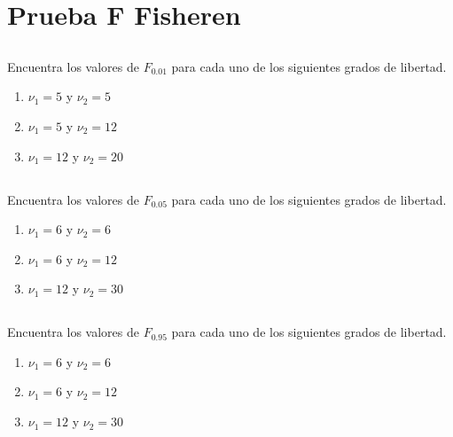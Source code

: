 \documentclass[11pt,letterpaper]{report}
\begin{document}
    \section{Prueba F Fisheren}
      \subsection{}
        Encuentra los valores de $F_{0.01}$ para cada uno de los siguientes grados de libertad.
        \begin{enumerate}
            \item $\nu_1=5$ y $\nu_2=5$
            \item $\nu_1=5$ y $\nu_2=12$
            \item $\nu_1=12$ y $\nu_2=20$
        \end{enumerate}

      \subsection{}
        Encuentra los valores de $F_{0.05}$ para cada uno de los siguientes grados de libertad.
        \begin{enumerate}
            \item $\nu_1=6$ y $\nu_2=6$
            \item $\nu_1=6$ y $\nu_2=12$
            \item $\nu_1=12$ y $\nu_2=30$
        \end{enumerate}
      \subsection{}
        Encuentra los valores de $F_{0.95}$ para cada uno de los siguientes grados de libertad.
        \begin{enumerate}
            \item $\nu_1=6$ y $\nu_2=6$
            \item $\nu_1=6$ y $\nu_2=12$
            \item $\nu_1=12$ y $\nu_2=30$
        \end{enumerate}
\end{document}
